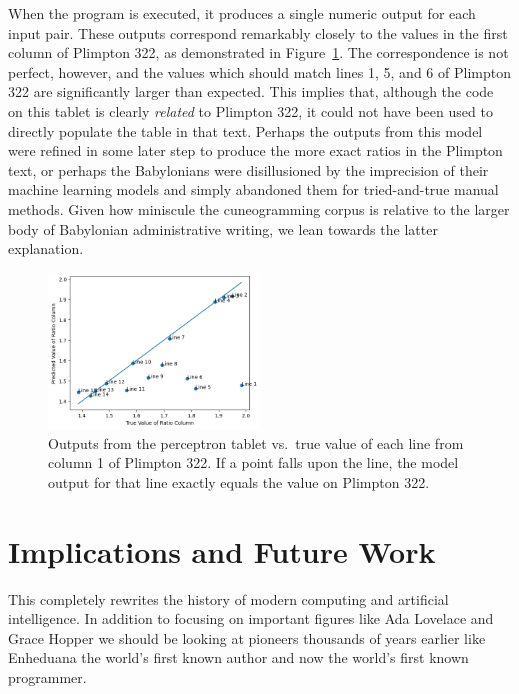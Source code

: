 \documentclass[11pt]{article}
\begin{document}
When the program is executed, it produces a single numeric output for each input pair. 
These outputs correspond remarkably closely to the values in the first column of Plimpton 322, as demonstrated in Figure~\ref{fig:graph}.
The correspondence is not perfect, however, and the values which should match lines 1, 5, and 6 of Plimpton 322 are significantly larger than expected.
This implies that, although the code on this tablet is clearly \textit{related} to Plimpton 322, it could not have been used to directly populate the table in that text.
Perhaps the outputs from this model were refined in some later step to produce the more exact ratios in the Plimpton text, or perhaps the Babylonians were disillusioned by the imprecision of their machine learning models and simply abandoned them for tried-and-true manual methods. 
Given how miniscule the cuneogramming corpus is relative to the larger body of Babylonian administrative writing, we lean towards the latter explanation.

\begin{figure}
    \includegraphics[width=0.5\textwidth]{graph.png}
    \caption{Outputs from the perceptron tablet vs.\ true value of each line from column 1 of Plimpton 322. If a point falls upon the line, the model output for that line exactly equals the value on Plimpton 322.}
    \label{fig:graph}
\end{figure}


\section{Implications and Future Work}
This completely rewrites the history of modern computing and artificial intelligence.
In addition to focusing on important figures like Ada Lovelace and Grace Hopper we should be looking at pioneers thousands of years earlier like Enheduana the world's first known author \cite{Helle2023} and now the world's first known programmer.
\end{document}
